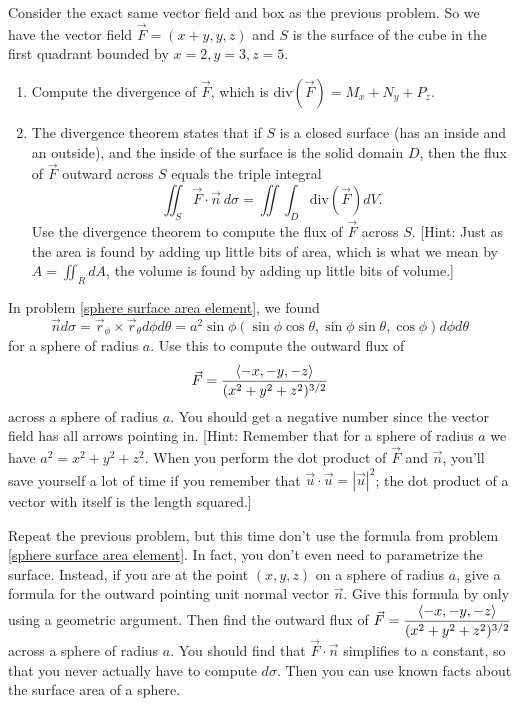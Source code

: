 \begin{problem}[Optional]
 Consider the exact same vector field and box as the previous problem.  So  we have the vector field $\vec F=(x+y,y,z) $  and $S$ is the surface of the cube in the first quadrant bounded by {$ x=2,y=3,z=5 $}.
\begin{enumerate}
 \item Compute the divergence of $\vec F$, which is $\text{div}(\vec F) = M_x+N_y+P_z$.
 \item The divergence theorem states that if $S$ is a closed surface (has an inside and an outside), and the inside of the surface is the solid domain $D$, then the flux of $\vec F$ outward across $S$ equals the triple integral
$$\iint_S\vec F\cdot \vec n\ d\sigma = \iint\int_D \text{div}(\vec F)dV.$$
 Use the divergence theorem to compute the flux of $\vec F$ across $S$. [Hint: Just as the area is found by adding up little bits of area, which is what we mean by $A=\iint_R dA$, the volume is found by adding up little bits of volume.] 
\end{enumerate}
\end{problem}


\begin{problem}[Optional]
In problem \ref{sphere surface area element}, we found 
$$\vec n d\sigma = \vec r_\phi\times \vec r_\theta d\phi d\theta = a^2\sin \phi (\sin\phi\cos\theta,\sin\phi\sin\theta,\cos\phi)d\phi d\theta$$ for a sphere of radius $a$.  
Use this to compute the outward flux of $$\displaystyle \vec F=\frac{\left<-x,-y,-z\right>}{(x^2+y^2+z^2)^{3/2}} $$ across a sphere of radius $a$. You should get a negative number since the vector field has all arrows pointing in. [Hint: Remember that for a sphere of radius $a$ we have $a^2=x^2+y^2+z^2$. When you perform the dot product of $\vec F$ and $\vec n$, you'll save yourself a lot of time if you remember that $\vec u\cdot \vec u = |\vec u|^2$; the dot product of a vector with itself is the length squared.]

\end{problem}


\begin{problem}[Optional]
Repeat the previous problem, but this time don't use the formula from problem \ref{sphere surface area element}. In fact, you don't even need to parametrize the surface. Instead, if you are at the point $(x,y,z)$ on a sphere of radius $a$, give a formula for the outward pointing unit normal vector $\vec n$. Give this formula by only using a geometric argument.  Then find the outward flux of {$\displaystyle \vec F=\frac{\left<-x,-y,-z\right>}{(x^2+y^2+z^2)^{3/2}} $} across a sphere of radius $a$. You should find that $\vec F\cdot \vec n$ simplifies to a constant, so that you never actually have to compute $d\sigma$. Then you can use known facts about the surface area of a sphere.

\end{problem}


